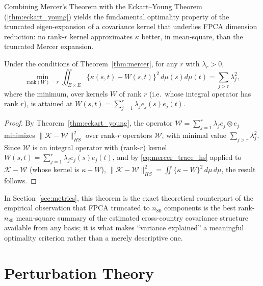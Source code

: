 Combining Mercer's Theorem with the Eckart--Young Theorem
(\ref{thm:eckart_young}) yields the fundamental optimality property of the
truncated eigen-expansion of a covariance kernel that underlies FPCA
dimension reduction: no rank-$r$ kernel approximates $\kappa$ better, in
mean-square, than the truncated Mercer expansion.

\begin{theorem}
\label{thm:mercer_optimal_rank}
Under the conditions of Theorem~\ref{thm:mercer}, for any $r$ with
$\lambda_r>0$,
\begin{equation}
\min_{\mathrm{rank}(W)=r}\iint_{E\times E}\{\kappa(s,t)-W(s,t)\}^2\,d\mu(s)
d\mu(t) = \sum_{j>r}\lambda_j^2,
\label{eq:mercer_optimal_rank}
\end{equation}
where the minimum, over kernels $W$ of rank $r$ (i.e.\ whose integral
operator has rank $r$), is attained at $W(s,t)=\sum_{j=1}^r\lambda_je_j(s)
e_j(t)$.
\end{theorem}

\begin{proof}
By Theorem~\ref{thm:eckart_young}, the operator $\mathcal{W}=\sum_{j=1}^r
\lambda_je_j\otimes e_j$ minimizes $\|\mathcal{K}-\mathcal{W}\|_{HS}^2$
over rank-$r$ operators $\mathcal{W}$, with minimal value $\sum_{j>r}
\lambda_j^2$. Since $\mathcal{W}$ is an integral operator with (rank-$r$)
kernel $W(s,t)=\sum_{j=1}^r\lambda_je_j(s)e_j(t)$, and by
\eqref{eq:mercer_trace_hs} applied to $\mathcal{K}-\mathcal{W}$ (whose
kernel is $\kappa-W$), $\|\mathcal{K}-\mathcal{W}\|_{HS}^2 = \iint\{\kappa-
W\}^2\,d\mu\,d\mu$, the result follows.
\end{proof}

In Section~\ref{sec:metrics}, this theorem is the exact theoretical
counterpart of the empirical observation that FPCA truncated to $n_{80}$
components is the best rank-$n_{80}$ mean-square summary of the estimated
cross-country covariance structure available from any basis; it is what
makes ``variance explained'' a meaningful optimality criterion rather than
a merely descriptive one.

\section{Perturbation Theory}
\label{sec:perturbation}

